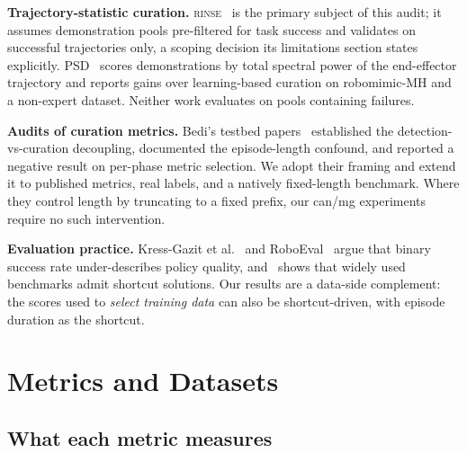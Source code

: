 \documentclass[10pt]{article}
\newcommand{\rinse}{\textmd{\textsc{rinse}}}
\begin{document}
\textbf{Trajectory-statistic curation.} \rinse{}~\citep{rinse} is the primary
subject of this audit; it assumes demonstration pools pre-filtered for task
success and validates on successful trajectories only, a scoping decision its
limitations section states explicitly. PSD~\citep{psd} scores demonstrations
by total spectral power of the end-effector trajectory and reports gains over
learning-based curation on robomimic-MH and a non-expert dataset. Neither
work evaluates on pools containing failures.

\textbf{Audits of curation metrics.} Bedi's testbed
papers~\citep{bedi-audit,bedi-policy,bedi-phase} established the
detection-vs-curation decoupling, documented the episode-length confound, and
reported a negative result on per-phase metric selection. We adopt their
framing and extend it to published metrics, real labels, and a natively
fixed-length benchmark. Where they control length by truncating to a fixed
prefix, our can/mg experiments require no such intervention.

\textbf{Evaluation practice.} Kress-Gazit et
al.~\citep{empirical-science} and RoboEval~\citep{roboeval} argue that binary
success rate under-describes policy quality, and~\citep{benchmarking-audit}
shows that widely used benchmarks admit shortcut solutions. Our results are a
data-side complement: the scores used to \emph{select training data} can also
be shortcut-driven, with episode duration as the shortcut.

\section{Metrics and Datasets}
\label{sec:setup}

\subsection{What each metric measures}
\label{sec:primer}
\end{document}
